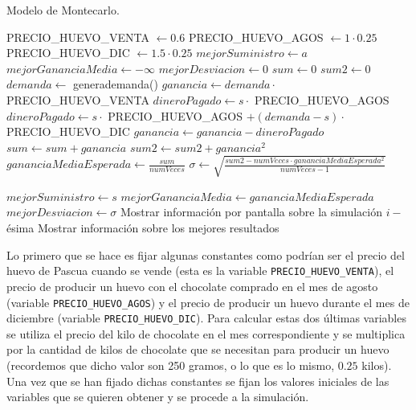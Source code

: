 \documentclass[11pt,a4paper]{article}
\begin{document}
\begin{algorithm}[H]
\caption{Modelo de Montecarlo.}
\begin{algorithmic}[1]
\State PRECIO\_HUEVO\_VENTA $\gets 0.6$
\State PRECIO\_HUEVO\_AGOS $\gets 1 \cdot 0.25$
\State PRECIO\_HUEVO\_DIC $\gets 1.5 \cdot 0.25$
\State $mejorSuministro \gets a$
\State $mejorGananciaMedia \gets -\infty$
\State $mejorDesviacion \gets 0$
	\State $sum \gets 0$
	\State $sum2 \gets 0$
		\State $demanda \gets$ generademanda()
		\State $ganancia \gets demanda \cdot$ PRECIO\_HUEVO\_VENTA
			\State $dineroPagado \gets s \cdot$ PRECIO\_HUEVO\_AGOS
		\Else
			\State $dineroPagado \gets s \cdot$ PRECIO\_HUEVO\_AGOS $+ (demanda - s) \cdot$ PRECIO\_HUEVO\_DIC
		\EndIf
		\State $ganancia \gets ganancia - dineroPagado$
		\State $sum \gets sum + ganancia$
		\State $sum2 \gets sum2 + ganancia^2$
	\EndFor
	\State $gananciaMediaEsperada \gets \frac{sum}{numVeces}$
	\State $\sigma \gets \sqrt{\frac{sum2 - numVeces \cdot gananciaMediaEsperada^2}{numVeces -1}}$
	
		\State $mejorSuministro \gets s$
		\State $mejorGananciaMedia \gets gananciaMediaEsperada$
		\State $mejorDesviacion \gets \sigma$
	\EndIf	
	\State Mostrar información por pantalla sobre la simulación $i-$ésima
\EndFor
\State Mostrar información sobre los mejores resultados
\end{algorithmic}
\end{algorithm}

Lo primero que se hace es fijar algunas constantes como podrían ser el precio del huevo de Pascua cuando
se vende (esta es la variable \texttt{PRECIO\_HUEVO\_VENTA}), el precio de producir un huevo
con el chocolate comprado en el mes de agosto (variable \texttt{PRECIO\_HUEVO\_AGOS}) y el precio de
producir un huevo durante el mes de diciembre (variable \texttt{PRECIO\_HUEVO\_DIC}). Para calcular
estas dos últimas variables se utiliza el precio del kilo de chocolate en el mes correspondiente
y se multiplica por la cantidad de kilos de chocolate que se necesitan para producir un huevo (recordemos
que dicho valor son 250 gramos, o lo que es lo mismo, $0.25$ kilos). Una vez que se han fijado dichas constantes
se fijan los valores iniciales de las variables que se quieren obtener y se procede a la simulación.
\end{document}
